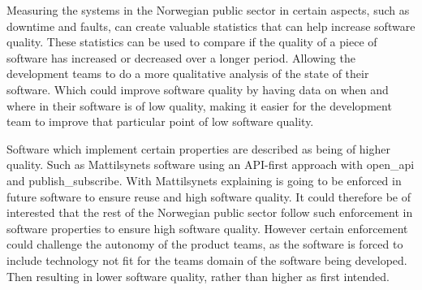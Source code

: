 Measuring the systems in the Norwegian public sector in certain aspects, such as downtime and faults, can create valuable statistics that can help increase software quality. These statistics can be used to compare if the quality of a piece of software has increased or decreased over a longer period. Allowing the development teams to do a more qualitative analysis of the state of their software. Which could improve software quality by having data on when and where in their software is of low quality, making it easier for the development team to improve that particular point of low software quality.

Software which implement certain properties are described as being of higher quality. Such as Mattilsynets software using an API-first approach with \gls{open_api} and \gls{publish_subscribe}. With Mattilsynets explaining is going to be enforced in future software to ensure reuse and high software quality. It could therefore be of interested that the rest of the Norwegian public sector follow such enforcement in software properties to ensure high software quality. However certain enforcement could challenge the autonomy of the product teams, as the software is forced to include technology not fit for the teams domain of the software being developed. Then resulting in lower software quality, rather than higher as first intended.




